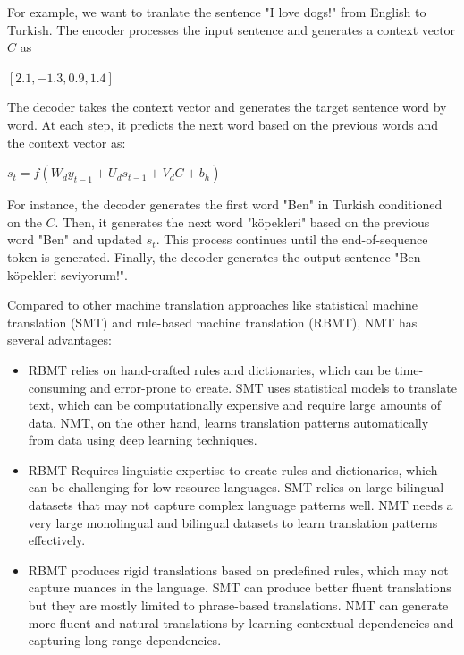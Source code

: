 \documentclass[10pt]{article}
\begin{document}
\begin{description}
For example, we want to tranlate the sentence "I love dogs!" from English to Turkish.
The encoder processes the input sentence and generates a context vector $C$ as

\begin{center}
    $[2.1, -1.3, 0.9, 1.4]$
\end{center}

The decoder takes the context vector and generates the target sentence word by word.
At each step, it predicts the next word based on the previous words and the context vector as:

\begin{center}
    $s_t = f(W_{d}y_{t-1} + U_{d}s_{t-1} + V_{d}C + b_h)$
\end{center}

For instance, the decoder generates the first word "Ben" in Turkish conditioned on the $C$.
Then, it generates the next word "köpekleri" based on the previous word "Ben" and updated $s_t$.
This process continues until the end-of-sequence token is generated. 
Finally, the decoder generates the output sentence "Ben köpekleri seviyorum!".

Compared to other machine translation approaches like statistical machine translation (SMT) and rule-based machine translation (RBMT), NMT has several advantages:

\begin{itemize}
    \item RBMT relies on hand-crafted rules and dictionaries, which can be time-consuming and error-prone to create.
    SMT uses statistical models to translate text, which can be computationally expensive and require large amounts of data.
    NMT, on the other hand, learns translation patterns automatically from data using deep learning techniques.
    \item RBMT Requires linguistic expertise to create rules and dictionaries, which can be challenging for low-resource languages.
    SMT relies on large bilingual datasets that may not capture complex language patterns well.
    NMT needs a very large monolingual and bilingual datasets to learn translation patterns effectively.
    \item RBMT produces rigid translations based on predefined rules, which may not capture nuances in the language.
    SMT can produce better fluent translations but they are mostly limited to phrase-based translations.
    NMT can generate more fluent and natural translations by learning contextual dependencies and capturing long-range dependencies.
\end{itemize}


\end{description}
\end{document}
